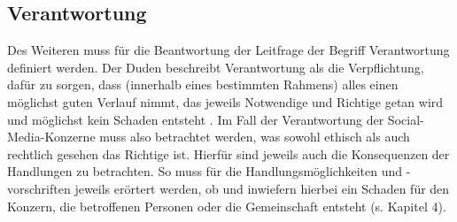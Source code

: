 \subsection{Verantwortung}
Des Weiteren muss für die Beantwortung der Leitfrage der Begriff Verantwortung definiert werden. Der Duden beschreibt Verantwortung als die \glqq Verpflichtung, dafür zu sorgen, dass (innerhalb eines bestimmten Rahmens) alles einen möglichst guten Verlauf nimmt, das jeweils Notwendige und Richtige getan wird und möglichst kein Schaden entsteht\grqq{} \autocite[vgl.][]{DudenVerantw}.  Im Fall der Verantwortung der Social-Media-Konzerne muss also betrachtet werden, was sowohl ethisch als auch rechtlich gesehen \glqq das Richtige\grqq{} ist. Hierfür sind jeweils auch die Konsequenzen der Handlungen zu betrachten. So muss für die Handlungsmöglichkeiten und -vorschriften jeweils erörtert werden, ob und inwiefern hierbei ein Schaden für den Konzern, die betroffenen Personen oder die Gemeinschaft entsteht (s. Kapitel 4).

